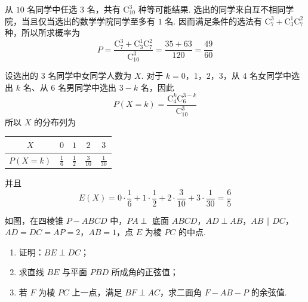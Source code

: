 \begin{solution}
从 \(10\) 名同学中任选 \(3\) 名，共有 \(\mathrm C_{10}^{3}\) 种等可能结果. 选出的同学来自互不相同学院，当且仅当选出的数学学院同学至多有 \(1\) 名. 因而满足条件的选法有 \(\mathrm C_{7}^{3}+\mathrm C_{3}^{1}\mathrm C_{7}^{2}\) 种，所以所求概率为
\[
P=\frac{\mathrm C_{7}^{3}+\mathrm C_{3}^{1}\mathrm C_{7}^{2}}{\mathrm C_{10}^{3}}=\frac{35+63}{120}=\frac{49}{60}
\]

设选出的 \(3\) 名同学中女同学人数为 \(X\). 对于 \(k=0\)，\(1\)，\(2\)，\(3\)，从 \(4\) 名女同学中选出 \(k\) 名、从 \(6\) 名男同学中选出 \(3-k\) 名，因此
\[
P(X=k)=\frac{\mathrm C_{4}^{k}\mathrm C_{6}^{3-k}}{\mathrm C_{10}^{3}}
\]
所以 \(X\) 的分布列为
\begin{center}
\begin{tabular}{c|cccc}
\hline
\(X\) & \(0\) & \(1\) & \(2\) & \(3\) \\
\hline
\(P(X=k)\) & \(\frac16\) & \(\frac12\) & \(\frac3{10}\) & \(\frac1{30}\) \\
\hline
\end{tabular}
\end{center}
并且
\[
E(X)=0\cdot\frac16+1\cdot\frac12+2\cdot\frac3{10}+3\cdot\frac1{30}=\frac65
\]
\end{solution}

\begin{problem}
如图，在四棱锥 \(P - ABCD\) 中，\(PA \perp\) 底面 \(ABCD\)，\(AD \perp AB\)，\(AB \parallel DC\)，\(AD = DC = AP = 2\)，\(AB = 1\)，点 \(E\) 为棱 \(PC\) 的中点.

\begin{enumerate}
\item 证明：\(BE \perp DC\)；
\item 求直线 \(BE\) 与平面 \(PBD\) 所成角的正弦值；
\item 若 \(F\) 为棱 \(PC\) 上一点，满足 \(BF \perp AC\)，求二面角 \(F - AB - P\) 的余弦值.
\end{enumerate}
\end{problem}

